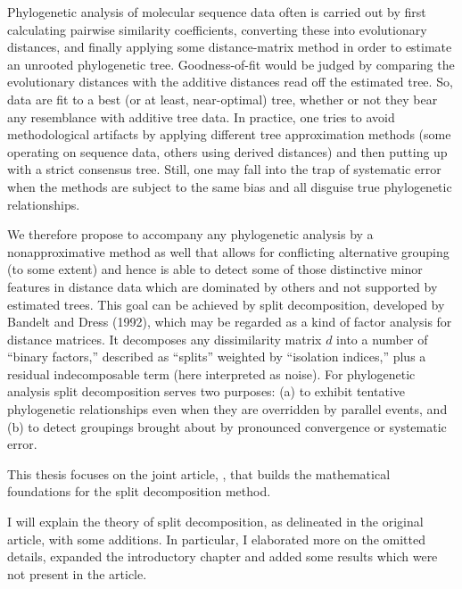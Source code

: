 \documentclass[./main.tex]{subfiles}
\begin{document}
\begin{displayquote}
    Phylogenetic analysis of molecular sequence data often is carried out by first calculating pairwise similarity coefficients, converting these into evolutionary distances, and finally applying some distance-matrix method in order to estimate an unrooted phylogenetic tree. Goodness-of-fit would be judged by comparing the evolutionary distances with the additive distances read off the estimated tree. So, data are fit to a best (or at least, near-optimal) tree, whether or not they bear any resemblance with additive tree data. In practice, one tries to avoid methodological artifacts by applying different tree approximation methods (some operating on sequence data, others using derived distances) and then putting up with a strict consensus tree. Still, one may fall into the trap of systematic error when the methods are subject to the same bias and all disguise true phylogenetic relationships. \par
    We therefore propose to accompany any phylogenetic analysis by a nonapproximative method as well that allows for conflicting alternative grouping (to some extent) and hence is able to detect some of those distinctive minor features in distance data which are dominated by others and not supported by estimated trees. This goal can be achieved by split decomposition, developed by Bandelt and Dress (1992), which may be regarded as a kind of factor analysis for distance matrices. It decomposes any dissimilarity matrix $d$ into a number of “binary factors,” described as “splits” weighted by “isolation indices,” plus a residual indecomposable term (here interpreted as noise). For phylogenetic analysis split decomposition serves two purposes: (a) to exhibit tentative phylogenetic relationships even when they are overridden by parallel events, and (b) to detect groupings brought about by pronounced convergence or systematic error.
\end{displayquote}

\clearpage

This thesis focuses on the joint article, \cite{BD92a}, that builds the mathematical foundations for the split decomposition method.

I will explain the theory of split decomposition, as delineated in the original article, with some additions. In particular, I elaborated more on the omitted details, expanded the introductory chapter and added some results which were not present in the article.\bigskip
\end{document}
